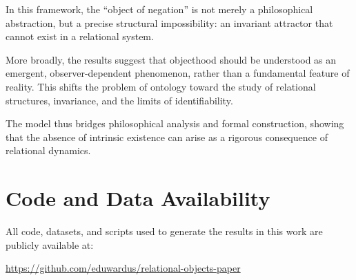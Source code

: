 \documentclass[11pt]{article}
\begin{document}
In this framework, the ``object of negation'' is not merely a philosophical abstraction, but a precise structural impossibility: an invariant attractor that cannot exist in a relational system.

More broadly, the results suggest that objecthood should be understood as an emergent, observer-dependent phenomenon, rather than a fundamental feature of reality. This shifts the problem of ontology toward the study of relational structures, invariance, and the limits of identifiability.

The model thus bridges philosophical analysis and formal construction, showing that the absence of intrinsic existence can arise as a rigorous consequence of relational dynamics.
\section{Code and Data Availability}

All code, datasets, and scripts used to generate the results in this work are publicly available at:

\begin{center}
\url{https://github.com/eduwardus/relational-objects-paper}
\end{center}


\end{document}
